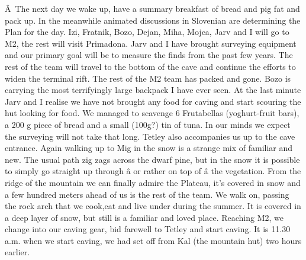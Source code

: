 Â~The next day we wake up, have a summary breakfast of bread and pig fat
and pack up. In the meanwhile animated discussions in Slovenian are
determining the Plan for the day. Izi, Fratnik, Bozo, Dejan, Miha,
Mojca, Jarv and I will go to M2, the rest will visit Primadona. Jarv and
I have brought surveying equipment and our primary goal will be to
measure the finds from the past few years. The rest of the team will
travel to the bottom of the cave and continue the efforts to widen the
terminal rift. The rest of the M2 team has packed and gone. Bozo is
carrying the most terrifyingly large backpack I have ever seen. At the
last minute Jarv and I realise we have not brought any food for caving
and start scouring the hut looking for food. We managed to scavenge 6
Frutabellas (yoghurt-fruit bars), a 200 g piece of bread and a small
(100g?) tin of tuna. In our minds we expect the surveying will not take
that long. Tetley also accompanies us up to the cave entrance. Again
walking up to Mig in the snow is a strange mix of familiar and new. The
usual path zig zags across the dwarf pine, but in the snow it is
possible to simply go straight up through â or rather on top of â
the vegetation. From the ridge of the mountain we can finally admire the
Plateau, it's covered in snow and a few hundred meters ahead of us is
the rest of the team. We walk on, passing the rock arch that we cook,eat
and live under during the summer. It is covered in a deep layer of snow,
but still is a familiar and loved place. Reaching M2, we change into our
caving gear, bid farewell to Tetley and start caving. It is 11.30 a.m.
when we start caving, we had set off from Kal (the mountain hut) two
hours earlier.

